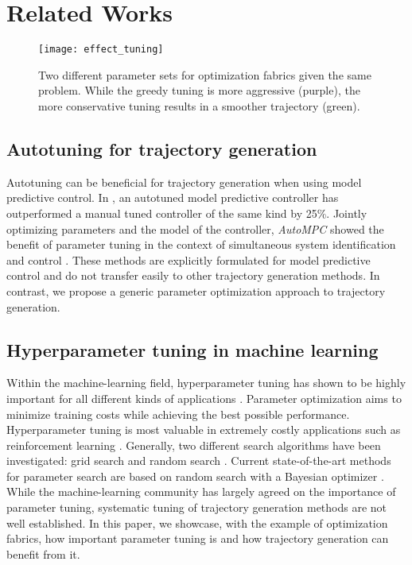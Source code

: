 \section{Related Works}%
\label{sec:related_works}
%
\begin{figure}[t]
    \centering
    \texttt{[image: effect\_tuning]}
    \captionsetup{belowskip=-10pt}
    \caption{Two different parameter sets for optimization fabrics given the same problem. While the greedy tuning
    is more aggressive (purple), the more conservative tuning results in a smoother trajectory (green).}
    \label{fig:effect_tuning}
\end{figure}
%

\subsection{Autotuning for trajectory generation}
%
Autotuning can be beneficial for trajectory generation when using model predictive control.
In \cite{loquercio_autotune_2022}, an autotuned
model predictive controller has outperformed a manual tuned controller of the same kind by 
25\%. Jointly optimizing parameters and the model of the controller, \textit{AutoMPC} 
showed the benefit of parameter tuning in the context of simultaneous system
identification and control \cite{edwards_automatic_2021}. These methods are explicitly 
formulated for model predictive control and do not transfer easily to other trajectory generation
methods. In contrast, we propose a generic parameter optimization approach to trajectory generation.

\subsection{Hyperparameter tuning in machine learning}
%
Within the machine-learning field, hyperparameter tuning has shown to be highly 
important for all different kinds of applications \cite{yang2020hyperparameter,hutter_automated_2019,optuna}. 
Parameter optimization aims to minimize 
training costs while achieving the best possible performance. Hyperparameter tuning 
is most valuable in extremely
costly applications such as reinforcement learning \cite{zoph_neural_2017}. Generally, two different search
algorithms have been investigated: grid search and random search \cite{bergstra_random_nodate}.
Current state-of-the-art methods for parameter search are based on 
random search with a Bayesian optimizer \cite{optuna,bergstra_algorithms_nodate}.
While the machine-learning community has largely agreed on the importance of
parameter tuning, systematic tuning of trajectory generation methods are not well established. 
In this paper, we showcase, with the example of optimization fabrics, how important 
parameter tuning is and how trajectory generation can benefit from it.
